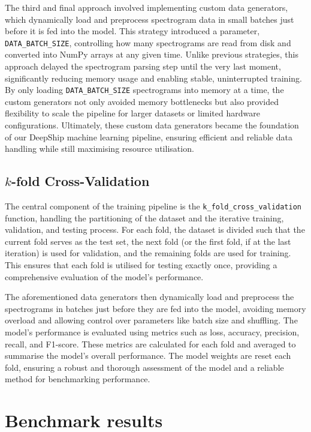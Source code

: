 The third and final approach involved implementing custom data generators, which dynamically load and preprocess spectrogram data in small batches just before it is fed into the model. This strategy introduced a parameter, \texttt{DATA\_BATCH\_SIZE}, controlling how many spectrograms are read from disk and converted into NumPy arrays at any given time. Unlike previous strategies, this approach delayed the spectrogram parsing step until the very last moment, significantly reducing memory usage and enabling stable, uninterrupted training. By only loading \texttt{DATA\_BATCH\_SIZE} spectrograms into memory at a time, the custom generators not only avoided memory bottlenecks but also provided flexibility to scale the pipeline for larger datasets or limited hardware configurations. Ultimately, these custom data generators became the foundation of our DeepShip machine learning pipeline, ensuring efficient and reliable data handling while still maximising resource utilisation. 

\subsection{\texorpdfstring{$k$}{k}-fold Cross-Validation}

The central component of the training pipeline is the \texttt{k\_fold\_cross\_validation} function, handling the partitioning of the dataset and the iterative training, validation, and testing process. For each fold, the dataset is divided such that the current fold serves as the test set, the next fold (or the first fold, if at the last iteration) is used for validation, and the remaining folds are used for training. This ensures that each fold is utilised for testing exactly once, providing a comprehensive evaluation of the model's performance.

The aforementioned data generators then dynamically load and preprocess the spectrograms in batches just before they are fed into the model, avoiding memory overload and allowing control over parameters like batch size and shuffling. The model's performance is evaluated using metrics such as loss, accuracy, precision, recall, and F1-score. These metrics are calculated for each fold and averaged to summarise the model's overall performance. The model weights are reset each fold, ensuring a robust and thorough assessment of the model and a reliable method for benchmarking performance.

\section{Benchmark results}

